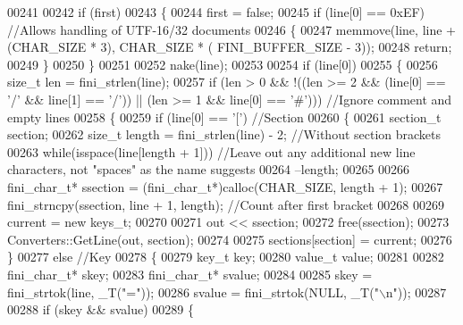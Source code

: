 \begin{DoxyCode}
00241 
00242          \textcolor{keywordflow}{if} (first)
00243          \{
00244             first = \textcolor{keyword}{false};
00245             \textcolor{keywordflow}{if} (line[0] == 0xEF) \textcolor{comment}{//Allows handling of UTF-16/32 documents}
00246             \{
00247                memmove(line, line + (CHAR_SIZE * 3), CHAR_SIZE * (
      FINI_BUFFER_SIZE - 3));
00248                \textcolor{keywordflow}{return};
00249             \}
00250          \}
00251 
00252          nake(line);
00253 
00254          \textcolor{keywordflow}{if} (line[0])
00255          \{
00256             \textcolor{keywordtype}{size\_t} len = fini_strlen(line);
00257             \textcolor{keywordflow}{if} (len > 0 && !((len >= 2 && (line[0] == \textcolor{charliteral}{'/'} && line[1] == \textcolor{charliteral}{'/'})) || (len >= 1 && line[0] == \textcolor{charliteral}{
      '#'})))  \textcolor{comment}{//Ignore comment and empty lines}
00258             \{
00259                \textcolor{keywordflow}{if} (line[0] == \textcolor{charliteral}{'['})  \textcolor{comment}{//Section}
00260                \{
00261                   section\_t section;
00262                   \textcolor{keywordtype}{size\_t} length = fini_strlen(line) - 2;  \textcolor{comment}{//Without section brackets}
00263                   \textcolor{keywordflow}{while}(isspace(line[length + 1]))  \textcolor{comment}{//Leave out any additional new line characters, not
       "spaces" as the name suggests}
00264                      --length;
00265 
00266                   fini_char_t* ssection = (fini_char_t*)calloc(CHAR_SIZE, length + 1);
00267                   fini_strncpy(ssection, line + 1, length);  \textcolor{comment}{//Count after first bracket}
00268 
00269                   current = \textcolor{keyword}{new} keys\_t;
00270 
00271                   out << ssection;
00272                   free(ssection);
00273                   Converters::GetLine(out, section);
00274 
00275                   sections[section] = current;
00276                \}
00277                \textcolor{keywordflow}{else}  \textcolor{comment}{//Key}
00278                \{
00279                   key\_t key;
00280                   value\_t value;
00281 
00282                   fini_char_t* skey;
00283                   fini_char_t* svalue;
00284 
00285                   skey = fini_strtok(line, _T(\textcolor{stringliteral}{"="}));
00286                   svalue = fini_strtok(NULL, _T(\textcolor{stringliteral}{"\(\backslash\)n"}));
00287 
00288                   \textcolor{keywordflow}{if} (skey && svalue)
00289                   \{

\end{DoxyCode}
